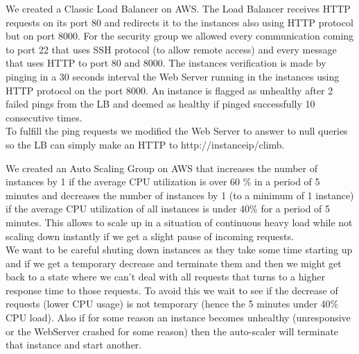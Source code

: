 \documentclass[times, 10pt,twocolumn]{article}
\begin{document}
   We created a Classic Load Balancer on AWS. The Load Balancer receives HTTP
   requests on its port 80 and redirects it to the instances also using HTTP
   protocol but on port 8000. For the security group we allowed every communication
   coming to port 22 that uses SSH protocol (to allow remote access) and every
   message that uses HTTP to port 80 and 8000. The instances verification is made 
   by pinging in a 30 seconds interval the Web Server running in the instances 
   using HTTP protocol on the port 8000. An instance is flagged as unhealthy after
   2 failed pings from the LB and deemed as healthy if pinged successfully 10 consecutive 
   times.\\
   To fulfill the ping requests we modified the Web Server to answer to null queries
   so the LB can simply make an HTTP to http://instanceip/climb.
   
   We created an Auto Scaling Group on AWS that increases the number of instances by
   1 if the average CPU utilization is over 60 \% in a period of 5 minutes and
   decreases the number of instances by 1 (to a minimum of 1 instance) if the average CPU 
   utilization of all instances is under 40\% for a period of 5 minutes. This allows
   to scale up in a situation of continuous heavy load while not scaling down instantly
   if we get a slight pause of incoming requests. \\
   We want to be careful shuting down instances as they take some time starting up and if 
   we get a temporary decrease and terminate them and then we might get back to a state
   where we can't deal with all requests that turns to a higher response time to those 
   requests. To avoid this we wait to see if the decrease of requests (lower CPU usage)
   is not temporary (hence the 5 minutes under 40\% CPU load). Also if for some reason
   an instance becomes unhealthy (unresponsive or the WebServer crashed for some reason)
   then the auto-scaler will terminate that instance and start another.
\end{document}
